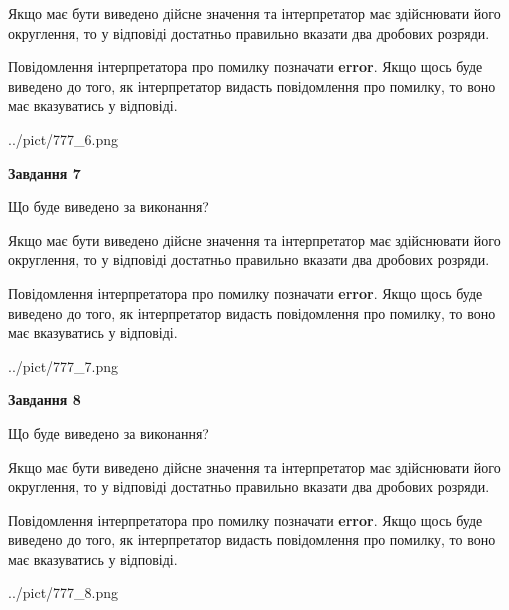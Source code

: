 \documentclass[12pt, ukrainian]{article}
\begin{document}
{\begin {Large}
Якщо має бути виведено дійсне значення та інтерпретатор має здійснювати його округлення, 
то у відповіді достатньо правильно вказати два дробових розряди.

Повідомлення інтерпретатора про помилку позначати \textbf{error}.
Якщо щось буде виведено до того, як інтерпретатор видасть повідомлення про помилку, 
то воно має вказуватись у відповіді. \par

\begin{center}
	{../pict/777_6.png}
\end{center}
\newpage

{\begin {center}\textbf{Завдання 7}\end {center}}\par
Що буде виведено за виконання? \par

Якщо має бути виведено дійсне значення та інтерпретатор має здійснювати його округлення, 
то у відповіді достатньо правильно вказати два дробових розряди.

Повідомлення інтерпретатора про помилку позначати \textbf{error}.
Якщо щось буде виведено до того, як інтерпретатор видасть повідомлення про помилку, 
то воно має вказуватись у відповіді. \par

\begin{center}
	{../pict/777_7.png}
\end{center}
\newpage

{\begin {center}\textbf{Завдання 8}\end {center}}\par
Що буде виведено за виконання? \par

Якщо має бути виведено дійсне значення та інтерпретатор має здійснювати його округлення, 
то у відповіді достатньо правильно вказати два дробових розряди.

Повідомлення інтерпретатора про помилку позначати \textbf{error}.
Якщо щось буде виведено до того, як інтерпретатор видасть повідомлення про помилку, 
то воно має вказуватись у відповіді. \par

\begin{center}
	{../pict/777_8.png}
\end{center}
\newpage


\end{Large}}
\end{document}
